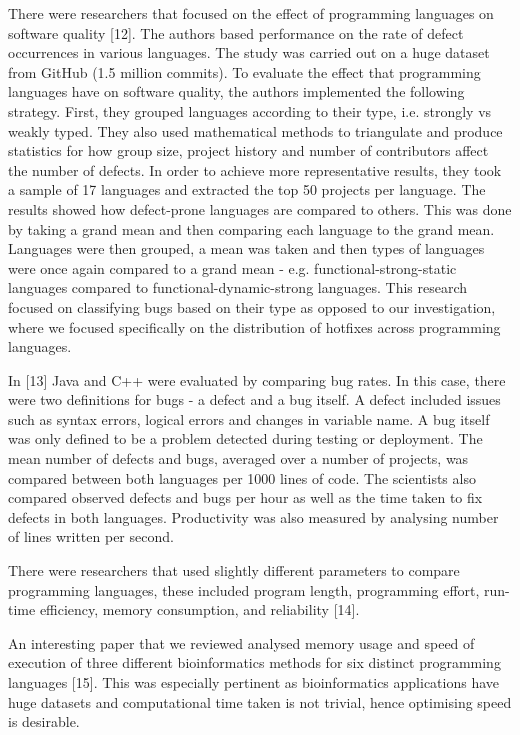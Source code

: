 There were researchers that focused on the effect of programming languages on software quality [12]. The authors based performance on the rate of defect occurrences in various languages. The study was carried out on a huge dataset from GitHub (1.5 million commits). To evaluate the effect that programming languages have on software quality, the authors implemented the following strategy. First, they grouped languages according to their type, i.e. strongly vs weakly typed. They also used mathematical methods to triangulate and produce statistics for how group size, project history and number of contributors affect the number of defects. In order to achieve more representative results, they took a sample of 17 languages and extracted the top 50 projects per language. The results showed how defect-prone languages are compared to others. This was done by taking a grand mean and then comparing each language to the grand mean. Languages were then grouped, a mean was taken and then types of languages were once again compared to a grand mean - e.g. functional-strong-static languages compared to functional-dynamic-strong languages. This research focused on classifying bugs based on their type as opposed to our investigation, where we focused specifically on the distribution of hotfixes across programming languages.\par

In [13] Java and C++ were evaluated by comparing bug rates. In this case, there were two definitions for bugs - a defect and a bug itself. A defect included issues such as syntax errors, logical errors and changes in variable name. A bug itself was only defined to be a problem detected during testing or deployment. The mean number of defects and bugs, averaged over a number of projects, was compared between both languages per 1000 lines of code. The scientists also compared observed defects and bugs per hour as well as the time taken to fix defects in both languages. Productivity was also measured by analysing number of lines written per second.\par

There were researchers that used slightly different parameters to compare programming languages, these included program length, programming effort, run-time efficiency, memory consumption, and reliability [14].\par

An interesting paper that we reviewed analysed memory usage and speed of execution of three different bioinformatics methods for six distinct programming languages [15]. This was especially pertinent as bioinformatics applications have huge datasets and computational time taken is not trivial, hence optimising speed is desirable.\par

